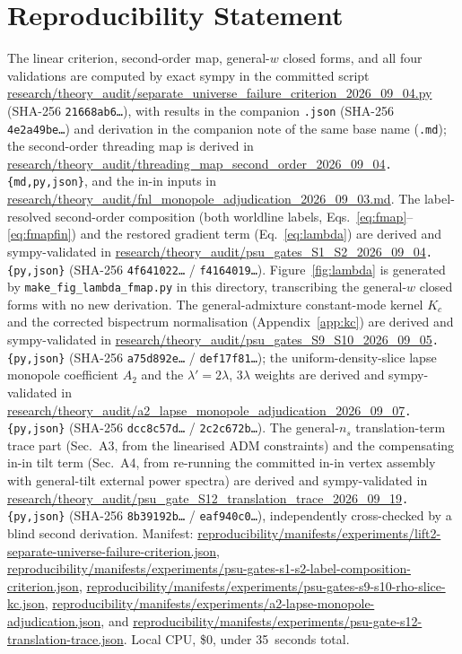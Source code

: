 \documentclass[aps,prd,twocolumn,superscriptaddress,showpacs,preprintnumbers,nofootinbib,longbibliography,floatfix]{revtex4-2}
\begin{document}
\section*{Reproducibility Statement}
The linear criterion, second-order map, general-$w$ closed forms, and all four
validations are computed by exact sympy in the committed script
\url{research/theory_audit/separate_universe_failure_criterion_2026_09_04.py}
(SHA-256 \texttt{21668ab6\ldots}), with results in the companion \texttt{.json}
(SHA-256 \texttt{4e2a49be\ldots}) and derivation in the companion note of the same base
name (\texttt{.md}); the second-order threading map is derived in
\url{research/theory_audit/threading_map_second_order_2026_09_04}\texttt{.\{md,py,json\}}, and the
in-in inputs in \url{research/theory_audit/fnl_monopole_adjudication_2026_09_03.md}. The
label-resolved second-order composition (both worldline labels, Eqs.~\eqref{eq:fmap}--%
\eqref{eq:fmapfin}) and the restored gradient term (Eq.~\eqref{eq:lambda}) are derived and
sympy-validated in \url{research/theory_audit/psu_gates_S1_S2_2026_09_04}\texttt{.\{py,json\}}
(SHA-256 \texttt{4f641022\ldots} / \texttt{f4164019\ldots}). Figure~\ref{fig:lambda} is
generated by \texttt{make\_fig\_lambda\_fmap.py} in this directory, transcribing the
general-$w$ closed forms with no new derivation. The general-admixture constant-mode kernel
$K_c$ and the corrected bispectrum normalisation (Appendix~\ref{app:kc}) are derived and
sympy-validated in
\url{research/theory_audit/psu_gates_S9_S10_2026_09_05}\texttt{.\{py,json\}}
(SHA-256 \texttt{a75d892e\ldots} / \texttt{def17f81\ldots}); the uniform-density-slice lapse
monopole coefficient $A_2$ and the $\lambda'=2\lambda$, $3\lambda$ weights are derived and
sympy-validated in
\url{research/theory_audit/a2_lapse_monopole_adjudication_2026_09_07}\texttt{.\{py,json\}}
(SHA-256 \texttt{dcc8c57d\ldots} / \texttt{2c2c672b\ldots}). The general-$n_s$ translation-term
trace part (Sec.~A3, from the linearised ADM constraints) and the compensating in-in tilt
term (Sec.~A4, from re-running the committed in-in vertex assembly with general-tilt external
power spectra) are derived and sympy-validated in
\url{research/theory_audit/psu_gate_S12_translation_trace_2026_09_19}\texttt{.\{py,json\}}
(SHA-256 \texttt{8b39192b\ldots} / \texttt{eaf940c0\ldots}), independently cross-checked by a
blind second derivation. Manifest:
\url{reproducibility/manifests/experiments/lift2-separate-universe-failure-criterion.json},
\url{reproducibility/manifests/experiments/psu-gates-s1-s2-label-composition-criterion.json},
\url{reproducibility/manifests/experiments/psu-gates-s9-s10-rho-slice-kc.json},
\url{reproducibility/manifests/experiments/a2-lapse-monopole-adjudication.json}, and
\url{reproducibility/manifests/experiments/psu-gate-s12-translation-trace.json}.
Local CPU, \$0, under 35~seconds total.
\end{document}
